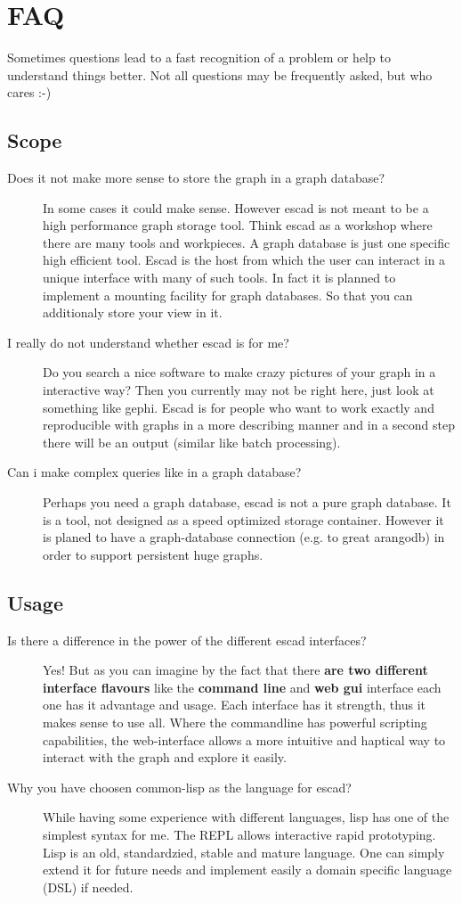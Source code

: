 \documentclass[a4paper, 12pt, openany]{scrbook}
\begin{document}
\section{FAQ}
Sometimes questions lead to a fast recognition of a problem or help to understand things better. Not all questions may be frequently asked, but who cares :-)
\subsection{Scope}
\begin{description}
\item[Does it not make more sense to store the graph in a graph database?] In some cases it could make sense. However escad is not meant to be a high performance graph storage tool. Think escad as a workshop where there are many tools and workpieces. A graph database is just one specific high efficient tool. Escad is the host from which the user can interact in a unique interface with many of such tools. In fact it is planned to implement a mounting facility for graph databases. So that you can additionaly store your view in it.
\item[I really do not understand whether escad is for me?] Do you search a nice software to make crazy pictures of your graph in a interactive way? Then you currently may not be right here, just look at something like gephi. Escad is for people who want to work exactly and reproducible with graphs in a more describing manner and in a second step there will be an output (similar like batch processing).
\item[Can i make complex queries like in a graph database?] Perhaps you need a graph database, escad is not a pure graph database. It is a tool, not designed as a speed optimized storage container. However it is planed to have a graph-database connection (e.g. to great arangodb) in order to support persistent huge graphs.
\end{description}
\subsection{Usage}
\begin{description}
\item[Is there a difference in the power of the different escad interfaces?] Yes! But as you can imagine by the fact that there \textbf{are two different interface flavours} like the \textbf{command line} and \textbf{web gui} interface each one has it advantage and usage. Each interface has it strength, thus it makes sense to use all. Where the commandline has powerful scripting capabilities, the web-interface allows a more intuitive and haptical way to interact with the graph and explore it easily.
\item[Why you have choosen common-lisp as the language for escad?] While having some experience with different languages, lisp has one of the simplest syntax for me. The REPL allows interactive rapid prototyping. Lisp is an old, standardzied, stable and mature language. One can simply extend it for future needs and implement easily a domain specific language (DSL) if needed.
\end{description}
\end{document}
